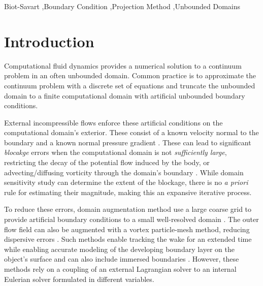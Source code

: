 \documentclass[final,1p,times]{elsarticle}
\begin{document}
\begin{frontmatter}
\begin{keyword}
Biot-Savart \sep Boundary Condition \sep Projection Method \sep Unbounded Domains
\end{keyword}

\end{frontmatter}



\section{Introduction}
Computational fluid dynamics provides a numerical solution to a continuum problem in an often unbounded domain. Common practice is to approximate the continuum problem with a discrete set of equations and truncate the unbounded domain to a finite computational domain with artificial unbounded boundary conditions. 

External incompressible flows enforce these artificial conditions on the computational domain's exterior. These consist of a known velocity normal to the boundary and a known normal pressure gradient \cite{Gresho1987}. These can lead to significant \emph{blocakge} errors when the computational domain is not \emph{sufficiently large}, restricting the decay of the potential flow induced by the body, or advecting/diffusing vorticity through the domain's boundary \cite{Colonius2008}. While domain sensitivity study can determine the extent of the blockage, there is no \emph{a priori} rule for estimating their magnitude, making this an expansive iterative process. 

To reduce these errors, domain augmentation method use a large coarse grid to provide artificial boundary conditions to a small well-resolved domain \cite{Colonius2008}. The outer flow field can also be augmented with a vortex particle-mesh method, reducing dispersive errors \cite{Billuart2023AFlows}. Such methods enable tracking the wake for an extended time while enabling accurate modeling of the developing boundary layer on the object's surface and can also include immersed boundaries \cite{Marichal2015UnboundedMethods}. However, these methods rely on a coupling of an external Lagrangian solver to an internal Eulerian solver formulated in different variables.
\end{document}
